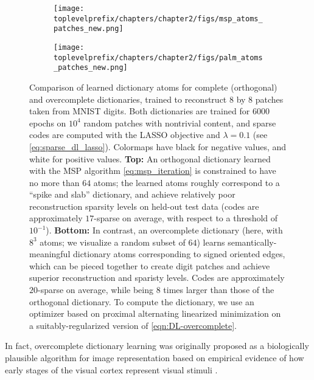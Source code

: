 \documentclass[../../book-main.tex]{subfiles}
\begin{document}
\begin{figure}[t]
\centering
    \begin{subfigure}{0.9\linewidth}
        \centering
        \texttt{[image: \\toplevelprefix/chapters/chapter2/figs/msp\_atoms\_patches\_new.png]}
        \caption{}
    \end{subfigure}
    \begin{subfigure}{0.9\linewidth}
        \centering
        \texttt{[image: \\toplevelprefix/chapters/chapter2/figs/palm\_atoms\_patches\_new.png]}
        \caption{}
    \end{subfigure}
    \caption{Comparison of learned dictionary atoms for complete (orthogonal)
    and overcomplete dictionaries, trained to reconstruct $8$ by $8$ patches taken from
    MNIST digits. Both dictionaries are trained for $6000$ epochs on $10^4$ random patches with
    nontrivial content, and sparse codes are computed with the LASSO objective
    and $\lambda=0.1$ (see \eqref{eq:sparse_dl_lasso}). Colormaps have black for negative values, and white for
    positive values. \textbf{Top:} An orthogonal dictionary learned with the
    MSP algorithm \eqref{eq:msp_iteration} is constrained to
    have no more than $64$ atoms; the learned atoms roughly correspond to
    a ``spike and slab'' dictionary, and achieve relatively poor reconstruction sparsity
    levels on held-out test data (codes are approximately $17$-sparse on
    average, with respect to a threshold of $10^{-1}$).
    \textbf{Bottom:} In contrast, an overcomplete dictionary (here, with $8^3$
    atoms; we visualize a random subset of $64$) learns
    semantically-meaningful dictionary atoms corresponding to signed oriented
    edges, which can be pieced together to create digit patches and achieve
    superior reconstruction and sparisty levels. Codes are approximately
    $20$-sparse on
    average, while being $8$ times larger than those of the orthogonal
    dictionary. To compute the
    dictionary, we use an optimizer based on proximal alternating linearized
    minimization on a suitably-regularized version of
    \eqref{eqn:DL-overcomplete}.}
    \label{fig:ReconMNIST}
\end{figure}

In fact, overcomplete dictionary learning was originally proposed as a biologically plausible algorithm for image representation based on empirical evidence of how early stages of the visual cortex represent visual stimuli \cite{Olshausen1996-ap,Olshausen1997-yv}. 
\end{document}
